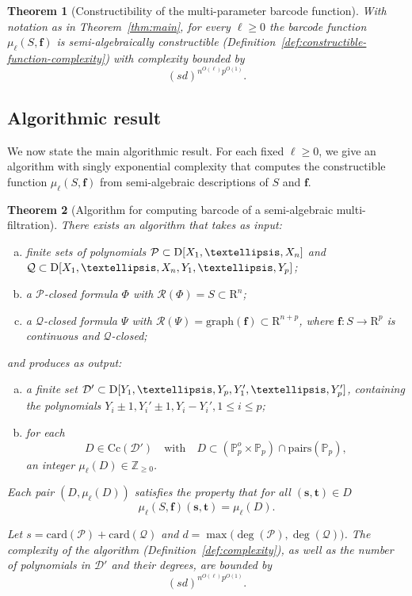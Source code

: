\documentclass{amsart}[10pts]
\newtheorem{theorem}{Theorem}
\theoremstyle{definition}
\theoremstyle{remark}
\theoremstyle{observation}
\numberwithin{equation}{section}
\newcommand {\R} {\mathrm{R}}
\newcommand {\D}     {\mbox{\rm D}}
\newcommand {\Z}  {\mathbb{Z}}
\newcommand {\RR} {{\mathcal R}}
\newcommand {\PP}     {\mathbb{P}} %
\newcommand{\card}{\mathrm{card}}
\newcommand{\Cc}{\mathrm{Cc}}
\newcommand{\Pairs}{\mathrm{pairs}}
\begin{document}
\begin{theorem}[Constructibility of the multi-parameter barcode function]
\label{thm:main:mu}
With notation as in Theorem~\ref{thm:main}, for every $\ell\ge 0$ the barcode function $\mu_\ell(S,\mathbf f)$ is semi-algebraically constructible (Definition~\ref{def:constructible-function-complexity}) with complexity bounded by
\[
(s d)^{n^{O(\ell)}p^{O(1)}}.
\]
\end{theorem}

\subsection{Algorithmic result}
\label{subsec:main:alg}

We now state the main algorithmic result. For each fixed $\ell\ge 0$, we give an algorithm with singly exponential complexity that computes the constructible function $\mu_\ell(S,\mathbf f)$ from semi-algebraic descriptions of $S$ and $\mathbf f$.

\begin{theorem}[Algorithm for computing barcode of a semi-algebraic multi-filtration]
\label{thm:alg:main:mu}
There exists an algorithm that takes as input:
\begin{enumerate}[(a)]
\item finite sets of polynomials
$\mathcal P\subset \D[X_1,\ldots,X_n]$ and
$\mathcal Q\subset \D[X_1,\ldots,X_n,Y_1,\ldots,Y_p]$;
\item a $\mathcal P$-closed formula $\Phi$ with $\RR(\Phi)=S \subset \R^n$;
\item a $\mathcal Q$-closed formula $\Psi$ with $\RR(\Psi)= \mathrm{graph}(\mathbf f)\subset \R^{n+p}$, where $\mathbf f:S\to \R^p$ is continuous and $\mathcal Q$-closed;
\end{enumerate}
and produces as output:
\begin{enumerate}[(a)]
    \item a finite set $\mathcal{D}' \subset \D[Y_1,\ldots,Y_p, Y_1',\ldots,Y_p']$, 
containing the polynomials $Y_i \pm 1,Y_i'\pm 1, Y_i - Y_i', 1 \leq i \leq p$; 
\item
for each 
\[
D\in \Cc(\mathcal D')
\quad\text{with}\quad
D\subset (\PP_p^{o}\times \PP_p)\cap \Pairs(\PP_p),
\] 
an integer
$\mu_\ell(D) \in \Z_{\geq 0}$.
\end{enumerate}

Each pair $(D,\mu_\ell(D))$ 
satisfies the property that for all 
$(\mathbf s,\mathbf t) \in D$
\[
\mu_\ell(S,\mathbf{f})(\mathbf s,\mathbf t) = 
\mu_\ell(D).
\]

Let $s=\card(\mathcal P)+\card(\mathcal Q)$ and $d=\max\bigl(\deg(\mathcal P),\deg(\mathcal Q)\bigr)$.
The complexity of the algorithm (Definition~\ref{def:complexity}), as well as the number of polynomials in $\mathcal D'$ and their degrees, are bounded by
\[
(s d)^{n^{O(\ell)}p^{O(1)}}.
\]
\end{theorem}
\end{document}
